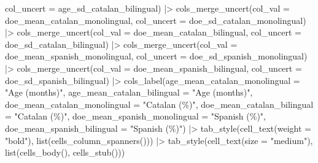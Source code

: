 \documentclass[
  letterpaper,
  DIV=11,
  numbers=noendperiod]{scrartcl}
\newenvironment{Shaded}{\begin{snugshade}}{\end{snugshade}}
\newcommand{\AttributeTok}[1]{\textcolor[rgb]{0.40,0.45,0.13}{#1}}
\newcommand{\FunctionTok}[1]{\textcolor[rgb]{0.28,0.35,0.67}{#1}}
\newcommand{\NormalTok}[1]{\textcolor[rgb]{0.00,0.23,0.31}{#1}}
\newcommand{\SpecialCharTok}[1]{\textcolor[rgb]{0.37,0.37,0.37}{#1}}
\newcommand{\StringTok}[1]{\textcolor[rgb]{0.13,0.47,0.30}{#1}}
\begin{document}
\begin{Shaded}
\begin{Highlighting}[]
                      \AttributeTok{col\_uncert =}\NormalTok{ age\_sd\_catalan\_bilingual) }\SpecialCharTok{|\textgreater{}} 
    \FunctionTok{cols\_merge\_uncert}\NormalTok{(}\AttributeTok{col\_val =}\NormalTok{ doe\_mean\_catalan\_monolingual,}
                      \AttributeTok{col\_uncert =}\NormalTok{ doe\_sd\_catalan\_monolingual) }\SpecialCharTok{|\textgreater{}} 
    \FunctionTok{cols\_merge\_uncert}\NormalTok{(}\AttributeTok{col\_val =}\NormalTok{ doe\_mean\_catalan\_bilingual,}
                      \AttributeTok{col\_uncert =}\NormalTok{ doe\_sd\_catalan\_bilingual) }\SpecialCharTok{|\textgreater{}} 
    \FunctionTok{cols\_merge\_uncert}\NormalTok{(}\AttributeTok{col\_val =}\NormalTok{ doe\_mean\_spanish\_monolingual, }
                      \AttributeTok{col\_uncert =}\NormalTok{ doe\_sd\_spanish\_monolingual) }\SpecialCharTok{|\textgreater{}} 
    \FunctionTok{cols\_merge\_uncert}\NormalTok{(}\AttributeTok{col\_val =}\NormalTok{ doe\_mean\_spanish\_bilingual, }
                      \AttributeTok{col\_uncert =}\NormalTok{ doe\_sd\_spanish\_bilingual) }\SpecialCharTok{|\textgreater{}} 
    \FunctionTok{cols\_label}\NormalTok{(}\AttributeTok{age\_mean\_catalan\_monolingual =} \StringTok{"Age (months)"}\NormalTok{,}
               \AttributeTok{age\_mean\_catalan\_bilingual =} \StringTok{"Age (months)"}\NormalTok{,}
               \AttributeTok{doe\_mean\_catalan\_monolingual =} \StringTok{"Catalan (\%)"}\NormalTok{,}
               \AttributeTok{doe\_mean\_catalan\_bilingual =} \StringTok{"Catalan (\%)"}\NormalTok{,}
               \AttributeTok{doe\_mean\_spanish\_monolingual =} \StringTok{"Spanish (\%)"}\NormalTok{,}
               \AttributeTok{doe\_mean\_spanish\_bilingual =} \StringTok{"Spanish (\%)"}\NormalTok{) }\SpecialCharTok{|\textgreater{}} 
    \FunctionTok{tab\_style}\NormalTok{(}\FunctionTok{cell\_text}\NormalTok{(}\AttributeTok{weight =} \StringTok{"bold"}\NormalTok{),}
              \FunctionTok{list}\NormalTok{(}\FunctionTok{cells\_column\_spanners}\NormalTok{())) }\SpecialCharTok{|\textgreater{}} 
    \FunctionTok{tab\_style}\NormalTok{(}\FunctionTok{cell\_text}\NormalTok{(}\AttributeTok{size =} \StringTok{"medium"}\NormalTok{),}
              \FunctionTok{list}\NormalTok{(}\FunctionTok{cells\_body}\NormalTok{(),}
                 \FunctionTok{cells\_stub}\NormalTok{()))}
\end{Highlighting}
\end{Shaded}
\end{document}
